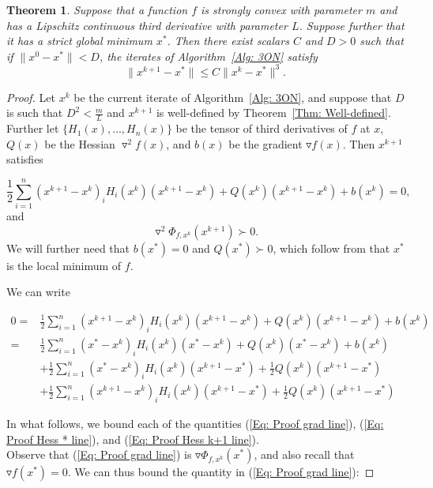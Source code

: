 \documentclass[11pt]{article}
\theoremstyle{plain}
\newtheorem{theorem}{Theorem}[section]
\theoremstyle{definition}
\theoremstyle{remark}
\def \grad{\triangledown}
\def \Hess{\triangledown^2}
\def \beq{\begin{equation}}
\def \eeq{\end{equation}}
\begin{document}
\begin{theorem}\label{Thm: Convergence}
Suppose that a function $f$ is strongly convex with parameter $m$ and has a Lipschitz continuous third derivative with parameter $L$. Suppose further that it has a strict global minimum $x^*$. Then there exist scalars $C$ and $D > 0$ such that if $\|x^0 - x^*\| < D$, the iterates of Algorithm~\ref{Alg: 3ON} satisfy $$\|x^{k+1} - x^*\| \le C\|x^k - x^*\|^3.$$
\end{theorem}
\begin{proof}
Let $x^k$ be the current iterate of Algorithm~\ref{Alg: 3ON}, and suppose that $D$ is such that $D^2 < \frac{m}{L}$ and $x^{k+1}$ is well-defined by Theorem~\ref{Thm: Well-defined}. Further let $\{H_1(x), \ldots, H_n(x)\}$ be the tensor of third derivatives of $f$ at $x$, $Q(x)$ be the Hessian $\Hess f(x)$, and $b(x)$ be the gradient $\grad f(x)$. Then $x^{k+1}$ satisfies

\beq\label{Eq: Gradient zero iterate} \frac{1}{2}\sum_{i=1}^n (x^{k+1}-x^k)_iH_i(x^k)(x^{k+1}-x^k) + Q(x^k)(x^{k+1}-x^k) + b(x^k) = 0, \eeq
and
\beq\label{Eq: Hessian pd iterate} \Hess \Phi_{f,x^k}(x^{k+1}) \succ 0.\eeq
We will further need that $b(x^*) = 0$ and $Q(x^*) \succ 0$, which follow from that $x^*$ is the local minimum of $f$.

We can write

\begin{align}
    0 =& \frac{1}{2}\sum_{i=1}^n (x^{k+1}-x^k)_iH_i(x^k)(x^{k+1}-x^k) + Q(x^k)(x^{k+1}-x^k) + b(x^k) \nonumber\\
    =& \frac{1}{2} \sum_{i=1}^n (x^*-x^k)_iH_i(x^k)(x^*-x^k) + Q(x^k)(x^*-x^k) + b(x^k) \label{Eq: Proof grad line}\\
     &+ \frac{1}{2} \sum_{i=1}^n (x^* - x^k)_iH_i(x^k)(x^{k+1}-x^*) + \frac{1}{2}Q(x^k)(x^{k+1}-x^*)\label{Eq: Proof Hess * line}\\
    &+ \frac{1}{2} \sum_{i=1}^n (x^{k+1} - x^k)_iH_i(x^k)(x^{k+1}-x^*) + \frac{1}{2}Q(x^k)(x^{k+1}-x^*)\label{Eq: Proof Hess k+1 line}
\end{align}

In what follows, we bound each of the quantities (\ref{Eq: Proof grad line}), (\ref{Eq: Proof Hess * line}), and (\ref{Eq: Proof Hess k+1 line}).\\

Observe that (\ref{Eq: Proof grad line}) is $\grad \Phi_{f,x^k}(x^*)$, and also recall that $\grad f(x^*) = 0$. We can thus bound the quantity in (\ref{Eq: Proof grad line}):


\end{proof}
\end{document}

